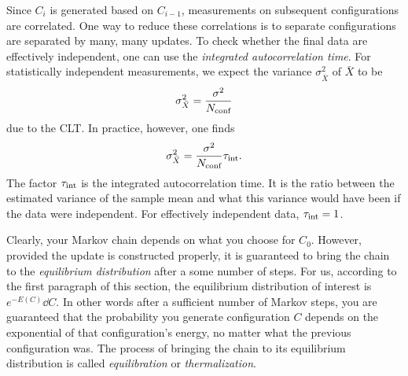 Since $C_i$ is generated based on $C_{i-1}$, measurements on subsequent
configurations are correlated. 
One way to reduce these correlations is to separate
configurations are separated by many, many updates.
To check whether the final data are effectively independent, one can use
the {\it integrated autocorrelation time}.
For statistically independent measurements, we expect the variance 
$\sigma^2_{\bar{X}}$ of $\bar{X}$ to be
\begin{equation}
  \sigma^2_{\bar{X}}=\frac{\sigma^2}{N_{\text{conf}}}
\end{equation}
due to the CLT. In practice, however, one finds
\begin{equation}
  \sigma^2_{\bar{X}}=\frac{\sigma^2}{N_{\text{conf}}}\tau_\text{int}.
\end{equation}
The
factor $\tau_\text{int}$ is the integrated autocorrelation time. It is the
ratio between the estimated variance of the sample
mean and what this variance would have been if the data were independent.
For effectively independent data, $\tau_\text{int}=1$.

Clearly, your Markov chain depends on what you choose for $C_0$. However,
provided the update is constructed properly, it is guaranteed to bring the chain
to the {\it equilibrium distribution} after a some number of steps.
For us, according to the first paragraph of this section, the equilibrium
distribution of interest is $e^{-E(C)}\dd C$. In other words after a sufficient
number of Markov steps, you are guaranteed that the probability you generate
configuration $C$ depends on the exponential of that configuration's energy, no
matter what the previous configuration was. The process of bringing the chain to
its equilibrium distribution is called {\it equilibration}
or {\it thermalization}. 





